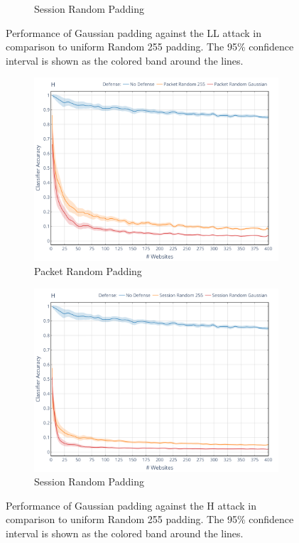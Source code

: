 \documentclass[
	ruledheaders=chapter,
	class=report,
	thesis={type=master, department=inf},
	accentcolor=1c,
	custommargins=true,
	marginpar=false,
	parskip=half-,
	fontsize=11pt,
]{tudapub}
\begin{document}
\begin{figure}
\begin{subfigure}{0.495\textwidth}
			\caption{Session Random Padding}
		\end{subfigure}
		\caption[Performance of Gaussian padding against the LL attack]{Performance of Gaussian padding against the LL attack \cite{Liberatore2006} in comparison to uniform Random 255 padding. The 95\% confidence interval is shown as the colored band around the lines.}
		\label{fig:ll}
	\end{figure}
	\begin{figure}
		\begin{subfigure}{0.495\textwidth}
			\centering
			\includegraphics[width=\textwidth]{plots/performance_h_pkt.png}
			\caption{Packet Random Padding}
		\end{subfigure}
		\hfill
		\begin{subfigure}{0.495\textwidth}
			\centering
			\includegraphics[width=\textwidth]{plots/performance_h_ses.png}
			\caption{Session Random Padding}
		\end{subfigure}
		\caption[Performance of Gaussian padding against the H attack]{Performance of Gaussian padding against the H attack \cite{Herrmann2009} in comparison to uniform Random 255 padding. The 95\% confidence interval is shown as the colored band around the lines.}
		\label{fig:h}
	\end{figure}
\end{document}
